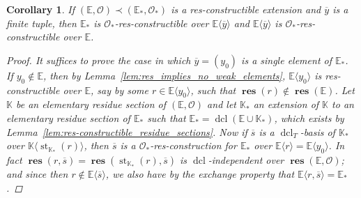 \documentclass{amsart}
\newtheorem{corollary}[theorem]{Corollary}
\theoremstyle{remark}
\theoremstyle{definition}
\theoremstyle{plain}
\newcommand{\bE}{\mathbb E}
\newcommand{\bK}{\mathbb K}
\newcommand{\cO}{\mathcal O}
\DeclareMathOperator{\res}{\mathbf{res}}
\DeclareMathOperator{\std}{\mathrm{st}}
\DeclareMathOperator{\dcl}{\mathrm{dcl}}
\theoremstyle{plain}
\begin{document}
\begin{corollary}\label{cor:finite_dim_fact}
    If $(\bE, \cO) \prec (\bE_*, \cO_*)$ is a res-constructible extension and $\overline{y}$ is a finite tuple, then $\bE_*$ is $\cO_*$-res-constructible over $\bE \langle \overline{y} \rangle$ and $\bE \langle \overline{y} \rangle$ is $\cO_*$-res-constructible over $\bE$.
    \begin{proof}
        It suffices to prove the case in which $\overline{y}=(y_0)$ is a single element of $\bE_*$. If $y_0 \notin \bE$, then by Lemma~\ref{lem:res_implies_no_weak_elements}, $\bE \langle y_0\rangle$ is res-constructible over $\bE$, say by some $r \in \bE \langle y_0 \rangle$, such that $\res(r) \notin \res(\bE)$. Let $\bK$ be an elementary residue section of $(\bE, \cO)$ and let $\bK_*$ an extension of $\bK$ to an elementary residue section of $\bE_*$ such that $\bE_*=\dcl(\bE \cup \bK_*)$, which exists by Lemma~\ref{lem:res-constructible_residue_sections}.
        Now if $\overline{s}$ is a $\dcl_T$-basis of $\bK_*$ over $\bK\langle\std_{\bK_*}(r)\rangle$, then $\overline{s}$ is a $\cO_*$-res-construction for $\bE_*$ over $\bE\langle r \rangle=\bE\langle y_0\rangle$.
        In fact $\res(r, \overline{s})=\res(\std_{\bK_*}(r), \overline{s})$ is $\dcl$-independent over $\res(\bE, \cO)$; and since then $r\notin \bE \langle \overline{s}\rangle$, we also have by the exchange property that $\bE \langle r, \overline{s}\rangle =\bE_*$. 
    \end{proof}
\end{corollary}
\end{document}
